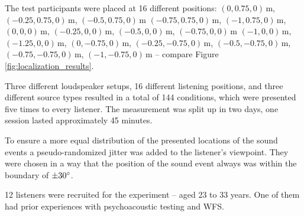 The test participants were placed at 16 different positions: \linebreak
$(0,0.75,0)$\,m,
$(-0.25,0.75,0)$\,m, $(-0.5,0.75,0)$\,m $(-0.75,0.75,0)$\,m, \linebreak
$(-1,0.75,0)$\,m,
$(0,0,0)$\,m, $(-0.25,0,0)$\,m, $(-0.5,0,0)$\,m, $(-0.75,0,0)$\,m $(-1,0,0)$\,m,
$(-1.25,0,0)$\,m, $(0,-0.75,0)$\,m, $(-0.25,-0.75,0)$\,m, \linebreak
$(-0.5,-0.75,0)$\,m,
$(-0.75,-0.75,0)$\,m, $(-1,-0.75,0)$\,m -- compare
Figure\,\ref{fig:localization_results}.

Three different loudspeaker setups, 16 different listening positions, and
three different source types resulted in a total of 144 conditions, which were
presented five times to every listener. The measurement was split up in two
days, one session lasted approximately 45 minutes.

To ensure a more equal distribution of the presented locations of the sound
events a pseudo-randomized jitter was added to the listener's viewpoint.
They were chosen in a way that the position of the sound event always was within
the boundary of $\pm 30^\circ$.

12 listeners were recruited for the experiment -- aged 23 to 33 years.
One of them had prior experiences with psychoacoustic testing and \ac{WFS}.


